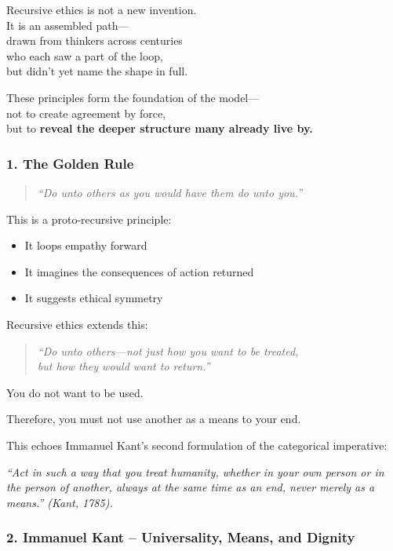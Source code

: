 Recursive ethics is not a new invention.\\
It is an assembled path---\\
drawn from thinkers across centuries\\
who each saw a part of the loop,\\
but didn't yet name the shape in full.

These principles form the foundation of the model---\\
not to create agreement by force,\\
but to \textbf{reveal the deeper structure many already live by.}

\subsubsection{\texorpdfstring{\textbf{1. The Golden
Rule}}{1. The Golden Rule}}\label{the-golden-rule}

\begin{quote}
\emph{``Do unto others as you would have them do unto you.''}
\end{quote}

This is a proto-recursive principle:

\begin{itemize}
\item
  It loops empathy forward
\item
  It imagines the consequences of action returned
\item
  It suggests ethical symmetry
\end{itemize}

Recursive ethics extends this:

\begin{quote}
\emph{``Do unto others---not just how you want to be treated,\\
but how they would want to return.''}
\end{quote}

You do not want to be used.

Therefore, you must not use another as a means to your end.

This echoes Immanuel Kant's second formulation of the categorical
imperative:

\emph{``Act in such a way that you treat humanity, whether in your own
person or in the person of another, always at the same time as an end,
never merely as a means.'' (Kant, 1785).}

\subsubsection{\texorpdfstring{\textbf{2. Immanuel Kant --
Universality, Means, and
Dignity}}{2. Immanuel Kant -- Universality, Means, and Dignity}}\label{immanuel-kant-universality-means-and-dignity}

